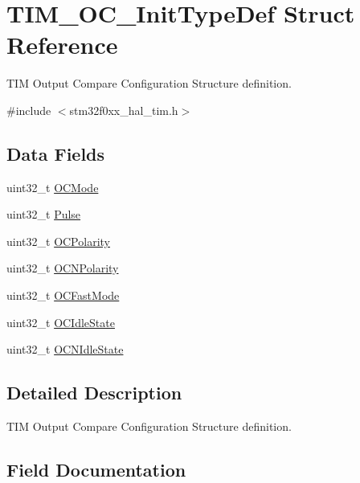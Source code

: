 \hypertarget{struct_t_i_m___o_c___init_type_def}{}\section{T\+I\+M\+\_\+\+O\+C\+\_\+\+Init\+Type\+Def Struct Reference}
\label{struct_t_i_m___o_c___init_type_def}


T\+IM Output Compare Configuration Structure definition.  




{\ttfamily \#include $<$stm32f0xx\+\_\+hal\+\_\+tim.\+h$>$}

\subsection*{Data Fields}
\begin{DoxyCompactItemize}
\item 
uint32\+\_\+t \hyperlink{struct_t_i_m___o_c___init_type_def_add4ac9143086c89effbede5c54e958bf}{O\+C\+Mode}
\item 
uint32\+\_\+t \hyperlink{struct_t_i_m___o_c___init_type_def_a5251c3bce4ca5baf013bc0ace0865a4c}{Pulse}
\item 
uint32\+\_\+t \hyperlink{struct_t_i_m___o_c___init_type_def_a781c7dae9dec8b6c974b1bdf591b77e7}{O\+C\+Polarity}
\item 
uint32\+\_\+t \hyperlink{struct_t_i_m___o_c___init_type_def_a978da9dd7cda80eb5fe8d04828b9bbcc}{O\+C\+N\+Polarity}
\item 
uint32\+\_\+t \hyperlink{struct_t_i_m___o_c___init_type_def_aadc3d763f52920adcd0150ffbad1043a}{O\+C\+Fast\+Mode}
\item 
uint32\+\_\+t \hyperlink{struct_t_i_m___o_c___init_type_def_a57bb589da3cf2b39b727fe4a3d334ab3}{O\+C\+Idle\+State}
\item 
uint32\+\_\+t \hyperlink{struct_t_i_m___o_c___init_type_def_a78d21970d78c1e3e328692743406ba25}{O\+C\+N\+Idle\+State}
\end{DoxyCompactItemize}


\subsection{Detailed Description}
T\+IM Output Compare Configuration Structure definition. 

\subsection{Field Documentation}
\mbox{\label{struct_t_i_m___o_c___init_type_def_aadc3d763f52920adcd0150ffbad1043a}} 
